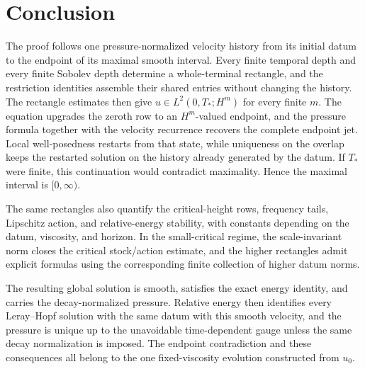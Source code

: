 \section{Conclusion}

The proof follows one pressure-normalized velocity history from its initial
datum to the endpoint of its maximal smooth interval.  Every finite temporal
depth and every finite Sobolev depth determine a whole-terminal rectangle,
and the restriction identities assemble their shared entries without changing
the history.  The rectangle estimates then give
\(u\in L^2(0,T_*;H^m)\) for every finite \(m\).  The equation upgrades the
zeroth row to an \(H^m\)-valued endpoint, and the pressure formula together
with the velocity recurrence recovers the complete endpoint jet.  Local
well-posedness restarts from that state, while uniqueness on the overlap keeps
the restarted solution on the history already generated by the datum.  If
\(T_*\) were finite, this continuation would contradict maximality.  Hence the
maximal interval is \([0,\infty)\).

The same rectangles also quantify the critical-height rows, frequency tails,
Lipschitz action, and relative-energy stability, with constants depending on
the datum, viscosity, and horizon.  In the small-critical regime, the
scale-invariant norm closes the critical stock/action estimate, and the higher
rectangles admit explicit formulas using the corresponding finite collection
of higher datum norms.

The resulting global solution is smooth, satisfies the exact energy identity,
and carries the decay-normalized pressure.  Relative energy then identifies
every Leray--Hopf solution with the same datum with this smooth velocity, and
the pressure is unique up to the unavoidable time-dependent gauge unless the
same decay normalization is imposed.  The endpoint contradiction and these
consequences all belong to the one fixed-viscosity evolution constructed from
\(u_0\).
